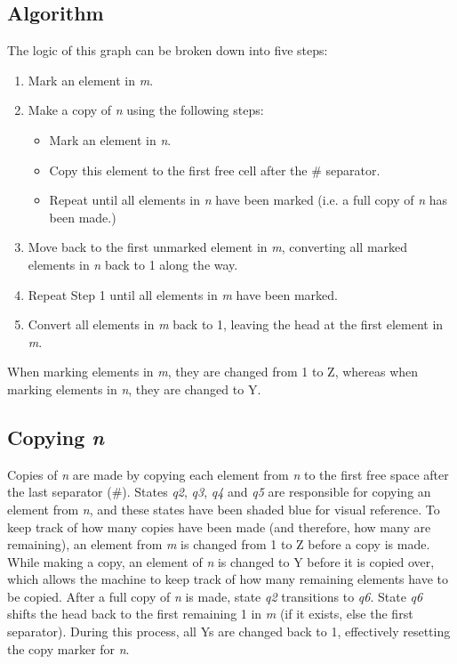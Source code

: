 \documentclass[a4paper,12pt]{article}
\begin{document}
\subsection{Algorithm}
The logic of this graph can be broken down into five steps:
\begin{enumerate}
	\item Mark an element in \textit{m}.
	\item Make a copy of \textit{n} using the following steps:
	\begin{itemize}
		\item Mark an element in \textit{n}.
		\item Copy this element to the first free cell after the \# separator.
		\item Repeat until all elements in \textit{n} have been marked (i.e. a full copy of \textit{n} has been made.)
	\end{itemize}
	\item Move back to the first unmarked element in \textit{m}, converting all marked elements in \textit{n} back to 1 along the way.
	\item Repeat Step 1 until all elements in \textit{m} have been marked.
	\item Convert all elements in \textit{m} back to 1, leaving the head at the first element in \textit{m}.
\end{enumerate}
When marking elements in \textit{m}, they are changed from 1 to Z, whereas when marking elements in \textit{n}, they are changed to Y.

\subsection{Copying \textit{n}}
Copies of \textit{n} are made by copying each element from \textit{n} to the first free space after the last separator (\#). States \textit{q2}, \textit{q3}, \textit{q4} and \textit{q5} are responsible for copying an element from \textit{n}, and these states have been shaded blue for visual reference.
To keep track of how many copies have been made (and therefore, how many are remaining), an element from \textit{m} is changed from 1 to Z before a copy is made. While making a copy, an element of \textit{n} is changed to Y before it is copied over, which allows the machine to keep track of how many remaining elements have to be copied. After a full copy of \textit{n} is made, state \textit{q2} transitions to \textit{q6}. State \textit{q6} shifts the head back to the first remaining 1 in \textit{m} (if it exists, else the first separator). During this process, all Ys are changed back to 1, effectively resetting the copy marker for \textit{n}.
\end{document}
